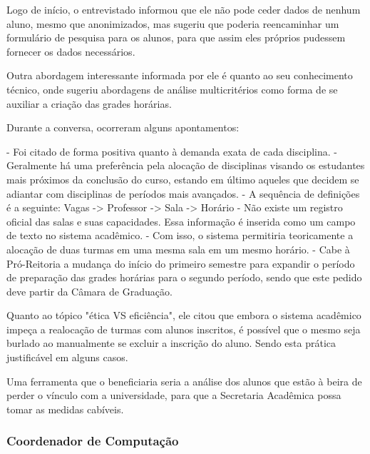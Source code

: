 
        Logo de início, o entrevistado informou que ele não pode ceder dados de nenhum aluno, mesmo que anonimizados, mas sugeriu que poderia reencaminhar um formulário de pesquisa para os alunos, para que assim eles próprios pudessem fornecer os dados necessários.

        Outra abordagem interessante informada por ele é quanto ao seu conhecimento técnico, onde sugeriu abordagens de análise multicritérios como forma de se auxiliar a criação das grades horárias.

        Durante a conversa, ocorreram alguns apontamentos:

        - Foi citado de forma positiva quanto à demanda exata de cada disciplina.
        - Geralmente há uma preferência pela alocação de disciplinas visando os estudantes mais próximos da conclusão do curso, estando em último aqueles que decidem se adiantar com disciplinas de períodos mais avançados.
        - A sequência de definições é a seguinte: Vagas -> Professor -> Sala -> Horário
        - Não existe um registro oficial das salas e suas capacidades. Essa informação é inserida como um campo de texto no sistema acadêmico.
        - Com isso, o sistema permitiria teoricamente a alocação de duas turmas em uma mesma sala em um mesmo horário.
        - Cabe à Pró-Reitoria a mudança do início do primeiro semestre para expandir o período de preparação das grades horárias para o segundo período, sendo que este pedido deve partir da Câmara de Graduação.

        Quanto ao tópico "ética VS eficiência", ele citou que embora o sistema acadêmico impeça a realocação de turmas com alunos inscritos, é possível que o mesmo seja burlado ao manualmente se excluir a inscrição do aluno. Sendo esta prática justificável em alguns casos.

        Uma ferramenta que o beneficiaria seria a análise dos alunos que estão à beira de perder o vínculo com a universidade, para que a Secretaria Acadêmica possa tomar as medidas cabíveis.

    \subsubsection{Coordenador de Computação} %

